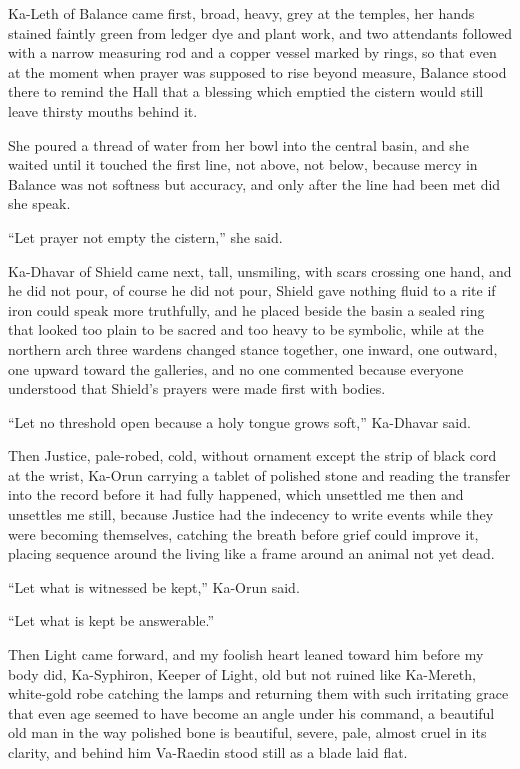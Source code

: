 Ka-Leth of Balance came first, broad, heavy, grey at the temples, her hands stained faintly green from 
ledger dye and plant work, and two attendants followed with a narrow measuring rod and a copper vessel 
marked by rings, so that even at the moment when prayer was supposed to rise beyond measure, Balance 
stood there to remind the Hall that a blessing which emptied the cistern would still leave thirsty mouths 
behind it.\par

She poured a thread of water from her bowl into the central basin, and she waited until it touched the 
first line, not above, not below, because mercy in Balance was not softness but accuracy, and only after 
the line had been met did she speak.\par

“Let prayer not empty the cistern,” she said.\par

Ka-Dhavar of Shield came next, tall, unsmiling, with scars crossing one hand, and he did not pour, of 
course he did not pour, Shield gave nothing fluid to a rite if iron could speak more truthfully, and he 
placed beside the basin a sealed ring that looked too plain to be sacred and too heavy to be symbolic, 
while at the northern arch three wardens changed stance together, one inward, one outward, one upward 
toward the galleries, and no one commented because everyone understood that Shield’s prayers were made 
first with bodies.\par

“Let no threshold open because a holy tongue grows soft,” Ka-Dhavar said.\par

Then Justice, pale-robed, cold, without ornament except the strip of black cord at the wrist, Ka-Orun 
carrying a tablet of polished stone and reading the transfer into the record before it had fully happened, 
which unsettled me then and unsettles me still, because Justice had the indecency to write events while 
they were becoming themselves, catching the breath before grief could improve it, placing sequence around 
the living like a frame around an animal not yet dead.\par

“Let what is witnessed be kept,” Ka-Orun said.\par

“Let what is kept be answerable.”\par

Then Light came forward, and my foolish heart leaned toward him before my body did, Ka-Syphiron, 
Keeper of Light, old but not ruined like Ka-Mereth, white-gold robe catching the lamps and returning 
them with such irritating grace that even age seemed to have become an angle under his command, a beautiful 
old man in the way polished bone is beautiful, severe, pale, almost cruel in its clarity, and behind 
him Va-Raedin stood still as a blade laid flat.\par

